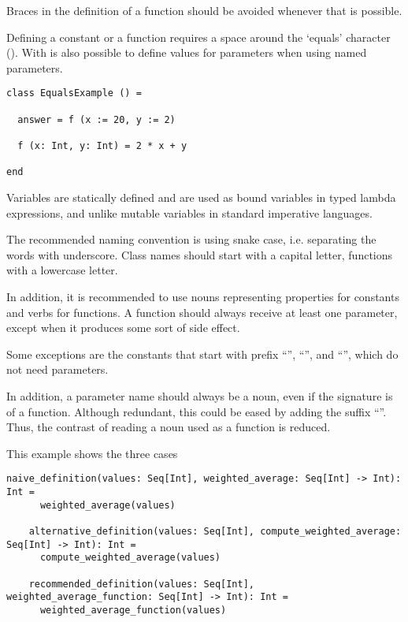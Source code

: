 Braces in the definition of a function should be avoided whenever that is possible.

Defining a constant or a function requires a space around the `equals' character (\sodadef).
With \sodadefparam is also possible to define values for parameters when using named parameters.

\begin{lstlisting}[label={lst:exampleFunctionWithoutBraces}]
class EqualsExample () =

  answer = f (x := 20, y := 2)

  f (x: Int, y: Int) = 2 * x + y

end
\end{lstlisting}


Variables are statically defined and are used as bound variables in typed lambda expressions, and unlike mutable variables in standard imperative languages.

The recommended naming convention is using snake case, i.e. separating the words with underscore.
Class names should start with a capital letter, functions with a lowercase letter.

In addition, it is recommended to use nouns representing properties for constants and verbs for functions.
A function should always receive at least one parameter, except when it produces some sort of side effect.

Some exceptions are the constants that start with prefix ``'', ``'', and ``'', which do not need parameters.

In addition, a parameter name should always be a noun, even if the signature is of a function.
Although redundant, this could be eased by adding the suffix ``''.
Thus, the contrast of reading a noun used as a function is reduced.

This example shows the three cases

\begin{lstlisting}[label={lst:exampleFunctionsAsParameter}]
    naive_definition(values: Seq[Int], weighted_average: Seq[Int] -> Int): Int =
      weighted_average(values)

    alternative_definition(values: Seq[Int], compute_weighted_average: Seq[Int] -> Int): Int =
      compute_weighted_average(values)

    recommended_definition(values: Seq[Int], weighted_average_function: Seq[Int] -> Int): Int =
      weighted_average_function(values)
\end{lstlisting}

